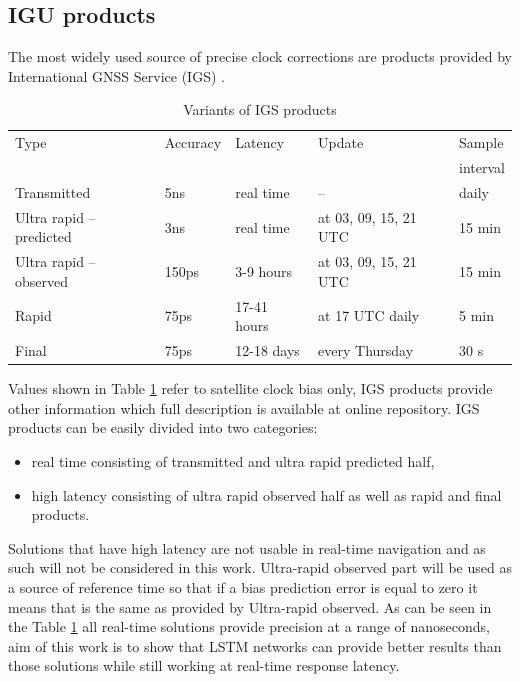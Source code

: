 \documentclass{kybernetika}
\begin{document}
\subsection{IGU products}
The most widely used source of precise clock corrections are products provided 
by International GNSS Service (IGS) \cite{IGS}.
\begin{table}[ht] 
	\centering
	\caption{Variants of IGS products}
	\label{tab:igs_products}
	\begin{tabular*}{\textwidth}{*{5}{l}}
		\hline
		\hline
		Type& Accuracy& Latency& Update& Sample \\
		&&&&interval\\
		\hline
		Transmitted & 5ns & real time & -- & daily  \\
		Ultra rapid -- predicted & 3ns & real time & at 03, 09, 15, 21 UTC & 15 min  \\
		Ultra rapid -- observed & 150ps & 3-9 hours & at 03, 09, 15, 21 UTC & 15 min  \\
		Rapid & 75ps & 17-41 hours & at 17 UTC daily & 5 min \\
		Final & 75ps & 12-18 days & every Thursday & 30 s \\
		\hline
		\hline
	\end{tabular*}
\end{table}
Values shown in Table \ref{tab:igs_products} refer to satellite clock bias only,  IGS products
provide other information which full description  is available at online repository. 
IGS products can be easily divided into two categories:
\begin{itemize}
	\item real time consisting of transmitted and ultra rapid predicted half,
	\item high latency consisting of ultra rapid observed half as well as rapid and final products.
\end{itemize}
Solutions that have high latency are not usable in real-time navigation and as such will not be
considered in this work. Ultra-rapid observed part will be used as a source of
reference time so that if a bias prediction error is equal to zero it means that is
the same as provided by Ultra-rapid observed.
As can be seen in the Table \ref{tab:igs_products} all real-time solutions provide precision 
at a range of nanoseconds, aim of this work is to show that LSTM networks can provide 
better results than those solutions while still working at real-time response latency.
\end{document}
